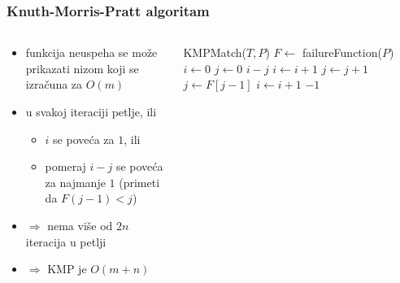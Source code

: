 \documentclass[compress,aspectratio=169]{beamer}
\begin{document}
\begin{frame}[fragile,shrink=12]
  \frametitle{Knuth-Morris-Pratt algoritam}
  \begin{columns}
    \begin{column}[t]{8cm}
      \begin{itemize}
        \item funkcija neuspeha se može prikazati nizom koji se izračuna za $O(m)$
        \item u svakoj iteraciji petlje, ili
        \begin{itemize}
          \item $i$ se poveća za $1$, ili
          \item pomeraj $i-j$ se poveća za najmanje $1$ (primeti da $F(j-1)<j$)
        \end{itemize}
        \item $\Rightarrow$ nema više od $2n$ iteracija u petlji
        \item $\Rightarrow$ KMP je $O(m+n)$
      \end{itemize}
    \end{column}
    \begin{column}[t]{8cm}
      {\small
      \begin{algorithmic}
        \STATE KMPMatch($T, P$)
        \STATE $F \leftarrow$ failureFunction($P$)
        \STATE $i \leftarrow 0$
        \STATE $j \leftarrow 0$
              \RETURN $i-j$ 
            \ELSE
              \STATE $i \leftarrow i+1$
              \STATE $j \leftarrow j+1$
            \ENDIF
          \ELSE
              \STATE $j \leftarrow F[j-1]$
            \ELSE
              \STATE $i \leftarrow i + 1$
            \ENDIF
          \ENDIF
        \ENDWHILE
        \RETURN $-1$ 
      \end{algorithmic}}
    \end{column}
  \end{columns}
\end{frame}
\end{document}

